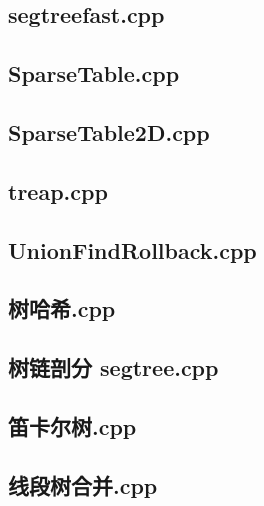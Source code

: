 \subsection{segtreefast.cpp}


\subsection{SparseTable.cpp}


\subsection{SparseTable2D.cpp}


\subsection{treap.cpp}


\subsection{UnionFindRollback.cpp}


\subsection{树哈希.cpp}


\subsection{树链剖分 segtree.cpp}


\subsection{笛卡尔树.cpp}


\subsection{线段树合并.cpp}


